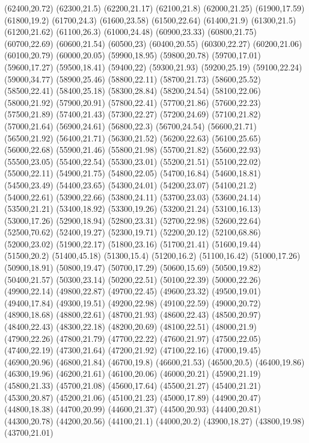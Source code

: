 (62400,20.72)
(62300,21.5)
(62200,21.17)
(62100,21.8)
(62000,21.25)
(61900,17.59)
(61800,19.2)
(61700,24.3)
(61600,23.58)
(61500,22.64)
(61400,21.9)
(61300,21.5)
(61200,21.62)
(61100,26.3)
(61000,24.48)
(60900,23.33)
(60800,21.75)
(60700,22.69)
(60600,21.54)
(60500,23)
(60400,20.55)
(60300,22.27)
(60200,21.06)
(60100,20.79)
(60000,20.05)
(59900,18.95)
(59800,20.78)
(59700,17.01)
(59600,17.27)
(59500,18.41)
(59400,22)
(59300,21.93)
(59200,25.19)
(59100,22.24)
(59000,34.77)
(58900,25.46)
(58800,22.11)
(58700,21.73)
(58600,25.52)
(58500,22.41)
(58400,25.18)
(58300,28.84)
(58200,24.54)
(58100,22.06)
(58000,21.92)
(57900,20.91)
(57800,22.41)
(57700,21.86)
(57600,22.23)
(57500,21.89)
(57400,21.43)
(57300,22.27)
(57200,24.69)
(57100,21.82)
(57000,21.64)
(56900,24.61)
(56800,22.3)
(56700,24.54)
(56600,21.71)
(56500,21.92)
(56400,21.71)
(56300,21.52)
(56200,22.63)
(56100,25.65)
(56000,22.68)
(55900,21.46)
(55800,21.98)
(55700,21.82)
(55600,22.93)
(55500,23.05)
(55400,22.54)
(55300,23.01)
(55200,21.51)
(55100,22.02)
(55000,22.11)
(54900,21.75)
(54800,22.05)
(54700,16.84)
(54600,18.81)
(54500,23.49)
(54400,23.65)
(54300,24.01)
(54200,23.07)
(54100,21.2)
(54000,22.61)
(53900,22.66)
(53800,24.11)
(53700,23.03)
(53600,24.14)
(53500,21.21)
(53400,18.92)
(53300,19.26)
(53200,21.24)
(53100,16.13)
(53000,17.26)
(52900,18.94)
(52800,23.31)
(52700,22.98)
(52600,22.64)
(52500,70.62)
(52400,19.27)
(52300,19.71)
(52200,20.12)
(52100,68.86)
(52000,23.02)
(51900,22.17)
(51800,23.16)
(51700,21.41)
(51600,19.44)
(51500,20.2)
(51400,45.18)
(51300,15.4)
(51200,16.2)
(51100,16.42)
(51000,17.26)
(50900,18.91)
(50800,19.47)
(50700,17.29)
(50600,15.69)
(50500,19.82)
(50400,21.57)
(50300,23.14)
(50200,22.51)
(50100,22.39)
(50000,22.26)
(49900,22.14)
(49800,22.87)
(49700,22.45)
(49600,23.32)
(49500,19.01)
(49400,17.84)
(49300,19.51)
(49200,22.98)
(49100,22.59)
(49000,20.72)
(48900,18.68)
(48800,22.61)
(48700,21.93)
(48600,22.43)
(48500,20.97)
(48400,22.43)
(48300,22.18)
(48200,20.69)
(48100,22.51)
(48000,21.9)
(47900,22.26)
(47800,21.79)
(47700,22.22)
(47600,21.97)
(47500,22.05)
(47400,22.19)
(47300,21.64)
(47200,21.92)
(47100,22.16)
(47000,19.45)
(46900,20.96)
(46800,21.84)
(46700,19.8)
(46600,21.53)
(46500,20.5)
(46400,19.86)
(46300,19.96)
(46200,21.61)
(46100,20.06)
(46000,20.21)
(45900,21.19)
(45800,21.33)
(45700,21.08)
(45600,17.64)
(45500,21.27)
(45400,21.21)
(45300,20.87)
(45200,21.06)
(45100,21.23)
(45000,17.89)
(44900,20.47)
(44800,18.38)
(44700,20.99)
(44600,21.37)
(44500,20.93)
(44400,20.81)
(44300,20.78)
(44200,20.56)
(44100,21.1)
(44000,20.2)
(43900,18.27)
(43800,19.98)
(43700,21.01)
